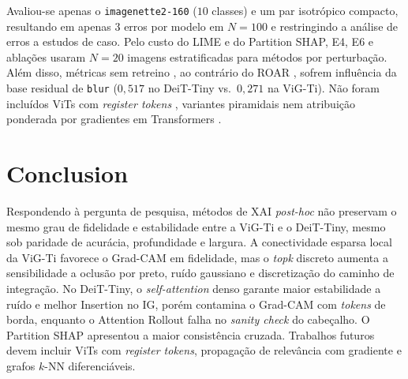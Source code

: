\documentclass{article}
\begin{document}
Avaliou-se apenas o \texttt{imagenette2-160} ($10$ classes) e um par isotrópico compacto, resultando em apenas $3$ erros por modelo em $N = 100$ e restringindo a análise de erros a estudos de caso. Pelo custo do LIME e do Partition SHAP, E4, E6 e ablações usaram $N = 20$ imagens estratificadas para métodos por perturbação. Além disso, métricas sem retreino \citep{petsiuk2018rise}, ao contrário do ROAR \citep{hooker2019roar}, sofrem influência da base residual de \texttt{blur} ($0{,}517$ no DeiT-Tiny vs.\ $0{,}271$ na ViG-Ti). Não foram incluídos ViTs com \textit{register tokens} \citep{darcet2024registers}, variantes piramidais nem atribuição ponderada por gradientes em Transformers \citep{chefer2021transformer}.

\section{Conclusion}
\label{sec:conclusion}

Respondendo à pergunta de pesquisa, métodos de XAI \textit{post-hoc} não preservam o mesmo grau de fidelidade e estabilidade entre a ViG-Ti e o DeiT-Tiny, mesmo sob paridade de acurácia, profundidade e largura. A conectividade esparsa local da ViG-Ti favorece o Grad-CAM em fidelidade, mas o \textit{topk} discreto aumenta a sensibilidade a oclusão por preto, ruído gaussiano e discretização do caminho de integração. No DeiT-Tiny, o \textit{self-attention} denso garante maior estabilidade a ruído e melhor Insertion no IG, porém contamina o Grad-CAM com \textit{tokens} de borda, enquanto o Attention Rollout falha no \textit{sanity check} do cabeçalho. O Partition SHAP apresentou a maior consistência cruzada. Trabalhos futuros devem incluir ViTs com \textit{register tokens}, propagação de relevância com gradiente e grafos $k$-NN diferenciáveis.

\clearpage


\end{document}
